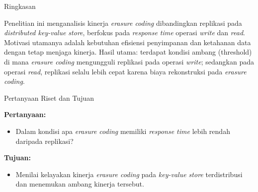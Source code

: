 \documentclass[a2,portrait]{config/poster/a0poster}
\newcommand{\postersection}[1]{%
	\begin{tcolorbox}[
		colback=ITBblue,
		colframe=ITBblue,
		fonttitle=\bfseries,
		coltext=white,
		sharp corners,
		boxrule=0pt,
		top=0pt,
		bottom=0pt,
		halign=center
	]
	\normalsize #1
	\end{tcolorbox}%
}
\begin{document}
\begin{multicols}{2} %
\normalsize %

\newcommand{\onecolimg}[2]{%
	\begin{center}
		\parbox{\columnwidth}{%
			\centering
			\texttt{[image: \#1]}
			\captionof{figure}{#2}
		}
	\end{center}
}


\postersection{Ringkasan}
\noindent Penelitian ini menganalisis kinerja \textit{erasure coding} dibandingkan replikasi pada \textit{distributed key-value store}, berfokus pada \textit{response time} operasi \textit{write} dan \textit{read}. Motivasi utamanya adalah kebutuhan efisiensi penyimpanan dan ketahanan data dengan tetap menjaga kinerja. Hasil utama: terdapat kondisi ambang (threshold) di mana \textit{erasure coding} mengungguli replikasi pada operasi \textit{write}; sedangkan pada operasi \textit{read}, replikasi selalu lebih cepat karena biaya rekonstruksi pada \textit{erasure coding}.


\postersection{Pertanyaan Riset dan Tujuan}
			\textbf{Pertanyaan:}
\begin{itemize}[leftmargin=*, itemsep=2pt]
	\item Dalam kondisi apa \textit{erasure coding} memiliki \textit{response time} lebih rendah daripada replikasi?
\end{itemize}
			\textbf{Tujuan:}
\begin{itemize}[leftmargin=*, itemsep=2pt]
	\item Menilai kelayakan kinerja \textit{erasure coding} pada \textit{key-value store} terdistribusi dan menemukan ambang kinerja tersebut.
\end{itemize}



\end{multicols}
\end{document}
